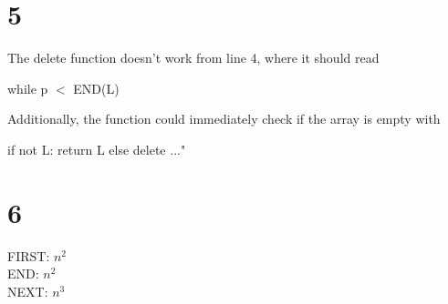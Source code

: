 \documentclass{article}
\begin{document}
\section{5}
The delete function doesn't work from line 4, where it should read\\
\begin{algorithm}[H]
while p $<$ END(L)
\end{algorithm}
Additionally, the function could immediately check if the array is empty with \\
\begin{algorithm}[H]
if not L:\;
	return L\; 
else\;
	delete ..."\;
\end{algorithm}

\section{6}
FIRST: $n^2$\\
END: $n^2$\\
NEXT: $n^3$\\
\end{document}
